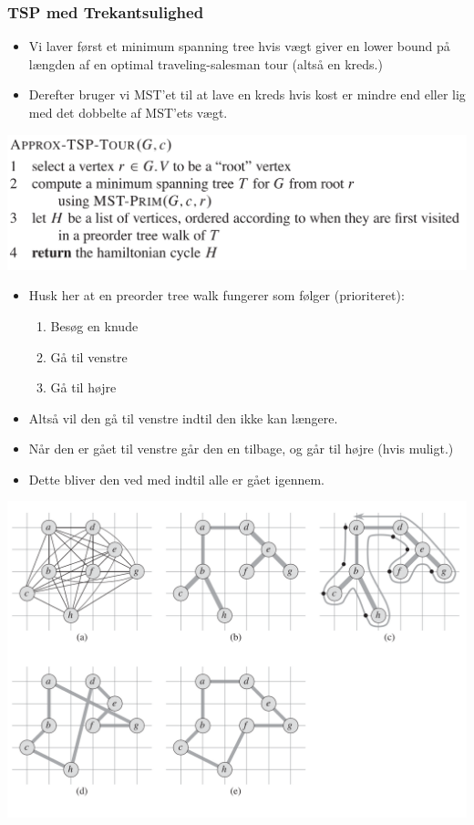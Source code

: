 \begin{frame}[allowframebreaks]
	\frametitle{TSP med Trekantsulighed}
	\begin{itemize}

		\item Vi laver først et minimum spanning tree hvis vægt giver en lower bound på længden af en optimal traveling-salesman tour (altså en kreds.)
		\item Derefter bruger vi MST'et til at lave en kreds hvis kost er mindre end eller lig med det dobbelte af MST'ets vægt.
	\end{itemize}
	\begin{center}
		\includegraphics[scale=0.3]{figur/approxtsptour.png}
	\end{center}
	\begin{itemize}
		\item Husk her at en preorder tree walk fungerer som følger (prioriteret):
		      \begin{enumerate}
			      \item Besøg en knude
			      \item Gå til venstre
			      \item Gå til højre
		      \end{enumerate}
		\item Altså vil den gå til venstre indtil den ikke kan længere.
		\item Når den er gået til venstre går den en tilbage, og går til højre (hvis muligt.)
		\item Dette bliver den ved med indtil alle er gået igennem.
	\end{itemize}
	\begin{center}
		\includegraphics[scale=0.3]{figur/figur3502.png}

\end{center}
\end{frame}
